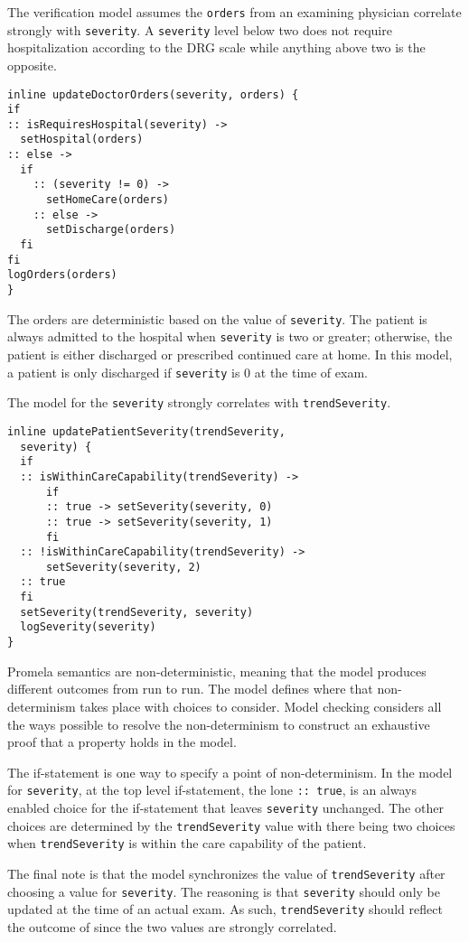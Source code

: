 The verification model assumes the \texttt{orders} from an examining physician correlate strongly with \texttt{severity}. A \texttt{severity} level below two does not require hospitalization according to the DRG scale while anything above two is the opposite.
%
{\small
\begin{lstlisting}[style=myPromela]
inline updateDoctorOrders(severity, orders) {
if
:: isRequiresHospital(severity) ->
  setHospital(orders)
:: else ->
  if
    :: (severity != 0) -> 
      setHomeCare(orders)
    :: else -> 
      setDischarge(orders)
  fi
fi
logOrders(orders)
}
\end{lstlisting}
}
%
\noindent The orders are deterministic based on the value of \texttt{severity}. The patient is always admitted to the hospital when \texttt{severity} is two or greater; otherwise, the patient is either discharged or prescribed continued care at home. In this model, a patient is only discharged if \texttt{severity} is 0 at the time of exam.

The model for the \texttt{severity} strongly correlates with \texttt{trendSeverity}.
%
{\small
\begin{lstlisting}[style=myPromela]
inline updatePatientSeverity(trendSeverity, 
  severity) {
  if
  :: isWithinCareCapability(trendSeverity) -> 
      if
      :: true -> setSeverity(severity, 0)
      :: true -> setSeverity(severity, 1)
      fi
  :: !isWithinCareCapability(trendSeverity) -> 
      setSeverity(severity, 2)
  :: true
  fi
  setSeverity(trendSeverity, severity)
  logSeverity(severity)
}
\end{lstlisting}
}
%
\noindent Promela semantics are non-deterministic, meaning that the model produces different outcomes from run to run. The model defines where that non-determinism takes place with choices to consider. Model checking considers all the ways possible to resolve the non-determinism to construct an exhaustive proof that a property holds in the model. 

The if-statement is one way to specify a point of non-determinism. In the model for \texttt{severity}, at the top level if-statement, the lone \texttt{:: true}, is an always enabled choice for the if-statement that leaves \texttt{severity} unchanged. The other choices are determined by the \texttt{trendSeverity} value with there being two choices when \texttt{trendSeverity} is within the care capability of the patient.

The final note is that the model synchronizes the value of \texttt{trendSeverity} after choosing a value for \texttt{severity}. The reasoning is that \texttt{severity} should only be updated at the time of an actual exam. As such, \texttt{trendSeverity} should reflect the outcome of since the two values are strongly correlated.

